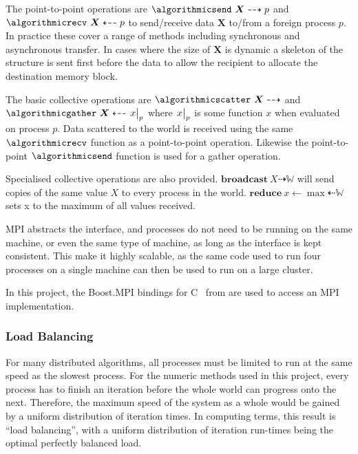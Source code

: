 \documentclass[twoside]{IIBproject}
\def\CC{{C\nolinebreak[4]\hspace{-.05em}\raisebox{.4ex}{\tiny\bf ++}}}
\newcommand{\vect} [1] {\bm{#1}}
\newcommand{\dra}{\dashrightarrow}
\newcommand{\dla}{\dashleftarrow}
\numberwithin{figure}{section}
\begin{document}
            The point-to-point operations are $\algorithmicsend\ \vect{X} \dra p$ and $\algorithmicrecv\ \vect{X} \dla p$ to send/receive data $\vect{X}$ to/from a foreign process $p$. In practice these cover a range of methods including synchronous and asynchronous transfer. In cases where the size of $\vect{X}$ is dynamic a skeleton of the structure is sent first before the data to allow the recipient to allocate the destination memory block. 

            The basic collective operations are $\algorithmicscatter\ \vect{X} \dra$ and $\algorithmicgather\ \vect{X} \dla \eval{x}_{p}$ where $\eval{x}_p$ is some function $x$ when evaluated on process $p$. Data scattered to the world is received using the same $\algorithmicrecv$ function as a point-to-point operation. Likewise the point-to-point $\algorithmicsend$ function is used for a gather operation.

            Specialised collective operations are also provided. $\textbf{broadcast}\ X \dra \mathbb{W}$ will send copies of the same value $X$ to every process in the world. $\textbf{reduce}\ x \gets \max \dla \mathbb{W}$ sets x to the maximum of all values received. 

            MPI abstracts the interface, and processes do not need to be running on the same machine, or even the same type of machine, as long as the interface is kept consistent. This make it highly scalable, as the same code used to run four processes on a single machine can then be used to run on a large cluster. 

            In this project, the Boost.MPI bindings for \CC~ from \cite{boost16} are used to access an MPI implementation. 



        \subsubsection{Load Balancing} %
            \label{sec:loadbalancing}

            For many distributed algorithms, all processes must be limited to run at the same speed as the slowest process. For the numeric methods used in this project, every process has to finish an iteration before the whole world can progress onto the next. Therefore, the maximum speed of the system as a whole would be gained by a uniform distribution of iteration times. In computing terms, this result is ``load balancing'', with a uniform distribution of iteration run-times being the optimal perfectly balanced load. 
\end{document}

